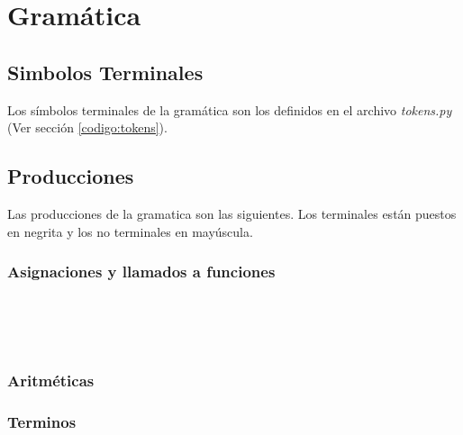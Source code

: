 \section{Gramática}
\label{sec:gramatica}

\subsection{Simbolos Terminales}
	Los símbolos terminales de la gramática son los definidos en el archivo 
	\textit{tokens.py} (Ver sección \ref{codigo:tokens}).

\subsection{Producciones}
	Las producciones de la gramatica son las siguientes. Los terminales
	están puestos en negrita y los no terminales en mayúscula.
\newToken{\SEMICOLON}{;}
\newToken{\LPARENT}{(}
\newToken{\RPARENT}{)}
\newToken{\LBRACKET}{[}
\newToken{\RBRACKET}{]}
\newToken{\LBRACE}{\left\lbrace}
\newToken{\RBRACE}{\right\rbrace}
\newToken{\ADD}{+}
\newToken{\MULT}{*}
\newToken{\COMMA}{,}
\subsubsection{Asignaciones y llamados a funciones}
\begin{reglas}
	\\
	\\
	\\
	\aregla{\CAPITALIZAR}
	\aregla{\COLINEALES}
	\aregla{\PRINT}
	\aregla{\LENGTH}
\end{reglas}
\subsubsection{Aritméticas}
\begin{reglas}
\end{reglas}
\subsubsection{Terminos}
\begin{reglas}
	\aregla{\STRING}
	\aregla{\TRUE}
	\aregla{\FALSE}
	\aregla{\ID}
	\aregla{\RES}
	\aregla{\ID \DOT \ID}
	\\
\end{reglas}
